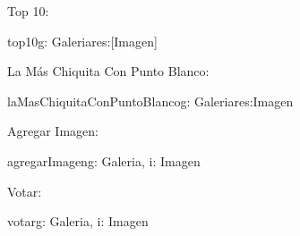 \documentclass[10pt,a4paper,spanish]{article}
\begin{document}
\begin{ejercicio}
	Top 10:

	\begin{problema}{top10}{g: Galeria}{res:[Imagen]}		

	\end{problema}
	
\end{ejercicio}

\begin{ejercicio}
	La M\'as Chiquita Con Punto Blanco:

	\begin{problema}{laMasChiquitaConPuntoBlanco}{g: Galeria}{res:Imagen}		

	\end{problema}
	
\end{ejercicio}

\begin{ejercicio}
	Agregar Imagen:

	\begin{problema}{agregarImagen}{g: Galeria, i: Imagen}{}
	\end{problema}

\end{ejercicio}

\begin{ejercicio}
	Votar:

	\begin{problema}{votar}{g: Galeria, i: Imagen}{}
	\end{problema}

\end{ejercicio}
\end{document}
